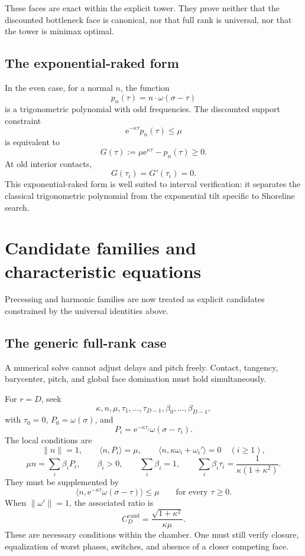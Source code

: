 \documentclass[10pt,a4paper]{article}
\newcommand{\e}{\mathrm{e}}
\newcommand{\ccand}{C^{\mathrm{cand}}}
\theoremstyle{plain}
\theoremstyle{definition}
\theoremstyle{remark}
\begin{document}
These faces are exact within the explicit tower. They prove neither that the discounted bottleneck face is canonical, nor that full rank is universal, nor that the tower is minimax optimal.

\subsection{The exponential-raked form}

In the even case, for a normal $n$, the function
\[
  p_n(\tau)=n\cdot\omega(\sigma-\tau)
\]
is a trigonometric polynomial with odd frequencies. The discounted support constraint
\[
  \e^{-\kappa\tau}p_n(\tau)\le\mu
\]
is equivalent to
\[
  G(\tau):=\mu\e^{\kappa\tau}-p_n(\tau)\ge0.
\]
At old interior contacts,
\[
  G(\tau_i)=G'(\tau_i)=0.
\]
This exponential-raked form is well suited to interval verification: it separates the classical trigonometric polynomial from the exponential tilt specific to Shoreline search.

\section{Candidate families and characteristic equations}

Precessing and harmonic families are now treated as explicit candidates constrained by the universal identities above.

\subsection{The generic full-rank case}

A numerical solve cannot adjust delays and pitch freely. Contact, tangency, barycenter, pitch, and global face domination must hold simultaneously.

For $r=D$, seek
\[
  \kappa,n,\mu,\tau_1,\ldots,\tau_{D-1},
  \beta_0,\ldots,\beta_{D-1},
\]
with $\tau_0=0$, $P_0=\omega(\sigma)$, and
\[
  P_i=\e^{-\kappa\tau_i}\omega(\sigma-\tau_i).
\]
The local conditions are
\[
  \|n\|=1,
  \qquad
  \langle n,P_i\rangle=\mu,
  \qquad
  \langle n,\kappa\omega_i+\omega_i'\rangle=0
  \quad(i\ge1),
\]
\[
  \mu n=\sum_i\beta_iP_i,
  \qquad
  \beta_i>0,
  \qquad
  \sum_i\beta_i=1,
  \qquad
  \sum_i\beta_i\tau_i=\frac{1}{\kappa(1+\kappa^2)}.
\]
They must be supplemented by
\[
  \langle n,\e^{-\kappa\tau}\omega(\sigma-\tau)\rangle\le\mu
  \qquad\text{for every }\tau\ge0.
\]
When $\|\omega'\|=1$, the associated ratio is
\[
  \ccand_D=\frac{\sqrt{1+\kappa^2}}{\kappa\mu}.
\]
These are necessary conditions within the chamber. One must still verify closure, equalization of worst phases, switches, and absence of a closer competing face.
\end{document}
